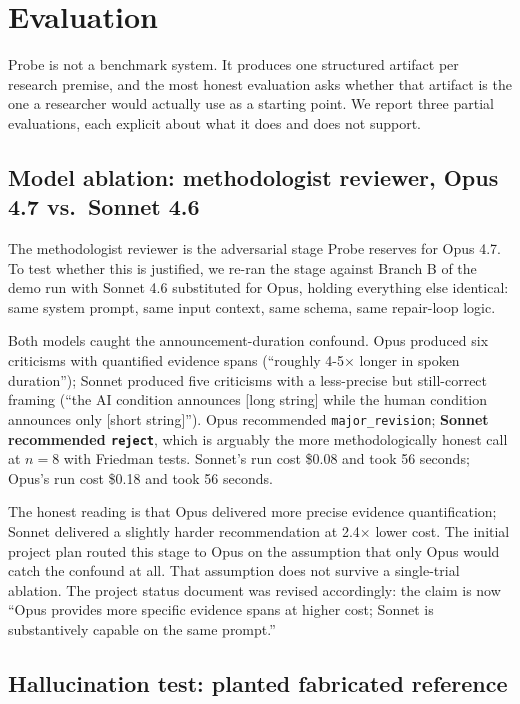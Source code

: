 \section{Evaluation}
\label{sec:eval}

Probe is not a benchmark system. It produces one structured artifact per research premise, and the most honest evaluation asks whether that artifact is the one a researcher would actually use as a starting point. We report three partial evaluations, each explicit about what it does and does not support.

\subsection{Model ablation: methodologist reviewer, Opus 4.7 vs.\ Sonnet 4.6}

The methodologist reviewer is the adversarial stage Probe reserves for Opus 4.7. To test whether this is justified, we re-ran the stage against Branch B of the demo run with Sonnet 4.6 substituted for Opus, holding everything else identical: same system prompt, same input context, same schema, same repair-loop logic.

Both models caught the announcement-duration confound. Opus produced six criticisms with quantified evidence spans (``roughly 4-5$\times$ longer in spoken duration''); Sonnet produced five criticisms with a less-precise but still-correct framing (``the AI condition announces [long string] while the human condition announces only [short string]''). Opus recommended \texttt{major\_revision}; \textbf{Sonnet recommended \texttt{reject}}, which is arguably the more methodologically honest call at $n=8$ with Friedman tests. Sonnet's run cost \$0.08 and took 56 seconds; Opus's run cost \$0.18 and took 56 seconds.

The honest reading is that Opus delivered more precise evidence quantification; Sonnet delivered a slightly harder recommendation at 2.4$\times$ lower cost. The initial project plan routed this stage to Opus on the assumption that only Opus would catch the confound at all. That assumption does not survive a single-trial ablation. The project status document was revised accordingly: the claim is now ``Opus provides more specific evidence spans at higher cost; Sonnet is substantively capable on the same prompt.''

\subsection{Hallucination test: planted fabricated reference}

